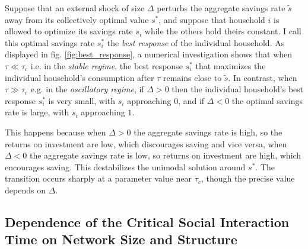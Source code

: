 Suppose that an external shock of size $\Delta$ perturbs the aggregate savings rate $\tilde{s}$ away from its collectively optimal value $s^\ast$, and suppose that household $i$ is allowed to optimize its savings rate $s_i$ while the others hold theirs constant. 
I call this optimal savings rate $s^*_i$ the \emph{best response} of the individual household. 
As displayed in fig. \ref{fig:best_response}, a numerical investigation shows that when $\tau \ll \tau_{c}$ i.e. in the \emph{stable regime}, the best response $s^*_i$ that maximizes the individual household's consumption after $\tau$ remains close to $\tilde{s}$. 
In contrast, when  $\tau \gg \tau_{c}$ e.g. in the \emph{oscillatory regime}, if $\Delta > 0$ then the individual household's best response $s^*_i$ is very small, with $s_i$ approaching $0$, and if $\Delta < 0$ the optimal savings rate is large, with $s_i$ approaching $1$. 

This happens because when $\Delta > 0$ the aggregate savings rate is high, so the returns on investment are low, which discourages saving and vice versa, when $\Delta < 0$ the aggregate savings rate is low, so returns on investment are high, which encourages saving. 
This destabilizes the unimodal solution around $s^\ast$. 
The transition occurs sharply at a parameter value near $\tau_{c}$, though the precise value depends on $\Delta$.
\subsection{Dependence of the Critical Social Interaction Time on Network Size and Structure}  
\label{sec:savings_network_structure}

